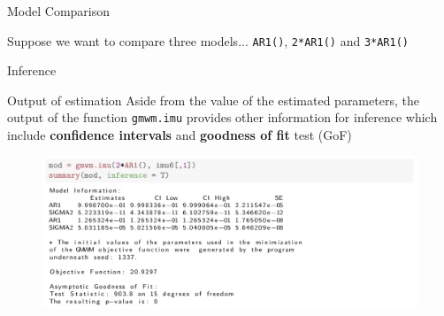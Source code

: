 \documentclass[envcountsect,usenames,dvipsnames]{beamer}
\theoremstyle{mystyle}
\begin{document}
\begin{frame}{Model Comparison}


\begin{block}{Suppose we want to compare three models...}
{\tt AR1()}, {\tt 2*AR1()} and {\tt 3*AR1()}

\end{block}

	\begin{figure}
	  \centering
	\end{figure}

\end{frame}

\begin{frame}{Inference}

\begin{block}{Output of estimation}
Aside from the value of the estimated parameters, the output of the function {\tt gmwm.imu} provides other information for inference which include \textbf{confidence intervals} and \textbf{goodness of fit} test (GoF)
\end{block}


\begin{figure}
	  \centering
	 	\includegraphics[width=1\textwidth]{Images/output_estimation.png}
	\end{figure}
\end{frame}
\end{document}

